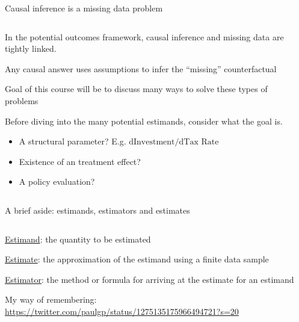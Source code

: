 \documentclass[notes,11pt, aspectratio=169]{beamer}
\newenvironment{wideitemize}{\itemize\addtolength{\itemsep}{10pt}}{\enditemize}
\begin{document}
\begin{frame}{Causal inference is a missing data problem}
\begin{columns}[T] %
\begin{column}{.65\textwidth}
  \begin{wideitemize}
  \item In the potential outcomes framework, causal inference and missing data are tightly linked.
  \item Any causal answer uses assumptions to infer the ``missing'' counterfactual 
  \item Goal of this course will be to discuss many ways to solve
    these types of problems
  \item Before diving into the many potential estimands, consider what
    the goal is.
    \begin{itemize}
    \item A structural parameter? E.g. $\text{dInvestment}/\text{dTax Rate}$
    \item Existence of an treatment effect?
    \item A policy evaluation?
    \end{itemize}
  \end{wideitemize}
\end{column}%
\hfill%
\begin{column}{.38\textwidth}

  \vspace{20pt}
  
  \vspace{20pt}
  
\end{column}%
\end{columns}
\end{frame}

\begin{frame}{A brief aside: estimands, estimators and estimates}
\begin{columns}[T] %
\begin{column}{.65\textwidth}
  \begin{wideitemize}
  \item \underline{Estimand}: the quantity to be estimated
  \item \underline{Estimate}: the approximation of the estimand using a finite data sample
  \item \underline{Estimator}: the method or formula for arriving at the estimate for an estimand
  \item My way of remembering: \url{https://twitter.com/paulgp/status/1275135175966494721?s=20}
  \end{wideitemize}
\end{column}%
\hfill%
\begin{column}{.38\textwidth}

  \vspace{20pt}
  
  \vspace{20pt}
  
\end{column}%
\end{columns}
\end{frame}
\end{document}
